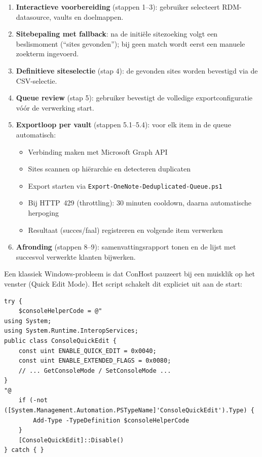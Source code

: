 \begin{enumerate}
    \item \textbf{Interactieve voorbereiding} (stappen 1--3): gebruiker selecteert RDM-datasource, vaults en doelmappen.
    \item \textbf{Sitebepaling met fallback}: na de initiële sitezoeking volgt een beslismoment (\enquote{sites gevonden}); bij geen match wordt eerst een manuele zoekterm ingevoerd.
    \item \textbf{Definitieve siteselectie} (stap 4): de gevonden sites worden bevestigd via de CSV-selectie.
    \item \textbf{Queue review} (stap 5): gebruiker bevestigt de volledige exportconfiguratie vóór de verwerking start.
    \item \textbf{Exportloop per vault} (stappen 5.1--5.4): voor elk item in de queue automatisch:
    \begin{itemize}
        \item Verbinding maken met Microsoft Graph API
        \item Sites scannen op hiërarchie en detecteren duplicaten
        \item Export starten via \texttt{Export-OneNote-Deduplicated-Queue.ps1}
        \item Bij HTTP~429 (throttling): 30 minuten cooldown, daarna automatische herpoging
        \item Resultaat (succes/faal) registreren en volgende item verwerken
    \end{itemize}
    \item \textbf{Afronding} (stappen 8--9): samenvattingsrapport tonen en de lijst met succesvol verwerkte klanten bijwerken.
\end{enumerate}

Een klassiek Windows-probleem is dat ConHost pauzeert bij een muisklik op het venster (Quick Edit Mode). Het script schakelt dit expliciet uit aan de start:

\begin{listing}[htbp]
\begin{lstlisting}
try {
    $consoleHelperCode = @"
using System;
using System.Runtime.InteropServices;
public class ConsoleQuickEdit {
    const uint ENABLE_QUICK_EDIT = 0x0040;
    const uint ENABLE_EXTENDED_FLAGS = 0x0080;
    // ... GetConsoleMode / SetConsoleMode ...
}
"@
    if (-not ([System.Management.Automation.PSTypeName]'ConsoleQuickEdit').Type) {
        Add-Type -TypeDefinition $consoleHelperCode
    }
    [ConsoleQuickEdit]::Disable()
} catch { }
\end{lstlisting}
\caption{Quick Edit uitschakelen om onbewaakte runs robuust te maken}
\label{lst:batch-unattended-quickedit}
\end{listing}

